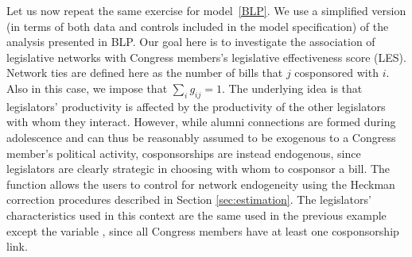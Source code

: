 \documentclass[nojss]{jss}
\begin{document}
Let us now repeat the same exercise for model~\ref{BLP}. We use a simplified version (in terms of both data and controls included in the model specification) of the analysis presented in BLP. Our goal here is to investigate the association of legislative networks with Congress members's legislative effectiveness score (LES). Network ties are defined here as the number
of bills that $j$ cosponsored with $i$. Also in this case, we impose that $\sum_{i}g_{ij}=1$. The underlying idea is that legislators' productivity is affected by the productivity of the other legislators with whom they interact. However, while alumni connections are formed during adolescence and can thus be reasonably assumed to be exogenous to a Congress member's political activity, cosponsorships are instead endogenous, since legislators are clearly strategic in choosing with whom to cosponsor a bill. The function  allows the users to control for network endogeneity using the Heckman correction procedures described in Section \ref{sec:estimation}. The legislators' characteristics used in this context are the same used in the previous example except the variable , since all Congress members have at least one cosponsorship link.
\end{document}
